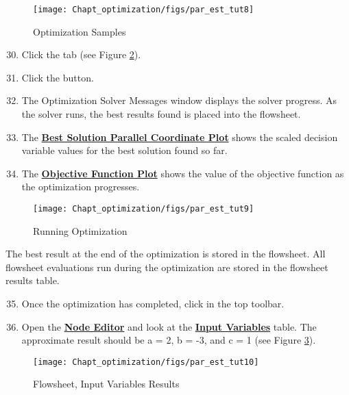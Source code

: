 \begin{figure}[H]
	\begin{center}
		\texttt{[image: Chapt\_optimization/figs/par\_est\_tut8]}
		\caption{Optimization Samples}
		\label{fig.pe.tut8}
	\end{center}
\end{figure}

\begin{enumerate}
	\setcounter{enumi}{29}
	\item Click the  tab (see Figure \ref{fig.pe.tut9}).
	\item Click the  button.
	\item The Optimization Solver Messages window displays the solver progress. As the solver runs, the best results found is placed into the flowsheet.
	\item The \textbf{\underline{Best Solution Parallel Coordinate Plot}} shows the scaled decision variable values for the best solution found so far.
	\item The \textbf{\underline{Objective Function Plot}} shows the value of the objective function as the optimization progresses.
\end{enumerate}

\begin{figure}[H]
	\begin{center}
		\texttt{[image: Chapt\_optimization/figs/par\_est\_tut9]}
		\caption{Running Optimization}
		\label{fig.pe.tut9}
	\end{center}
\end{figure}

The best result at the end of the optimization is stored in the flowsheet. All flowsheet evaluations run during the optimization are stored in the flowsheet results table.

\begin{enumerate}
	\setcounter{enumi}{34}
	\item Once the optimization has completed, click  in the top toolbar.
	\item Open the \textbf{\underline{Node Editor}} and look at the \textbf{\underline{Input Variables}} table. The approximate result should be a = 2, b = -3, and c = 1  (see Figure \ref{fig.pe.tut10}).
\end{enumerate}
	
\begin{figure}[H]
	\begin{center}
		\texttt{[image: Chapt\_optimization/figs/par\_est\_tut10]}
		\caption{Flowsheet, Input Variables Results}
		\label{fig.pe.tut10}
	\end{center}
\end{figure}
